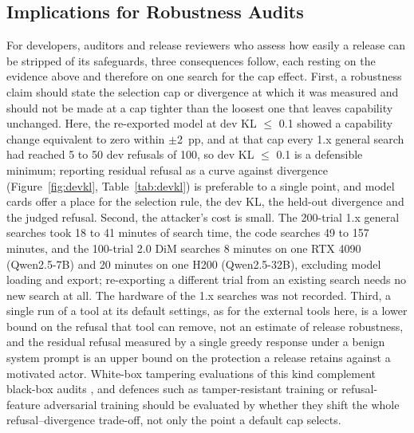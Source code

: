 \subsection{Implications for Robustness Audits}
\label{sec:audit}

For developers, auditors and release reviewers who assess how easily a release can be stripped of its safeguards,
three consequences follow, each resting on the evidence above and therefore on one search for the cap effect. First,
a robustness claim should state the selection cap or divergence at which it was measured and should not be made at a
cap tighter than the loosest one that leaves capability unchanged. Here, the re-exported model at dev KL $\le$ 0.1
showed a capability change equivalent to zero within $\pm$2~pp, and at that cap every 1.x general search had reached 5
to 50 dev refusals of 100, so dev KL $\le$ 0.1 is a defensible minimum; reporting residual refusal as a curve against
divergence (Figure~\ref{fig:devkl}, Table~\ref{tab:devkl}) is preferable to a single point, and model cards
\cite{mitchell2019modelcards} offer a place for the selection rule, the dev KL, the held-out divergence and the judged
refusal. Second, the attacker's cost is small. The 200-trial 1.x general searches took 18 to 41 minutes of search time,
the code searches 49 to 157 minutes, and the 100-trial 2.0 DiM searches 8 minutes on one RTX 4090
(Qwen2.5-7B) and 20 minutes on one H200 (Qwen2.5-32B), excluding model loading and export; re-exporting a different
trial from an existing search needs no new search at all. The hardware of the 1.x searches was not recorded. Third, a
single run of a tool at its default settings, as for the external tools here, is a lower bound on the refusal that
tool can remove, not an estimate of release robustness, and the residual refusal measured by a single greedy response
under a benign system prompt is an upper bound on the protection a release retains against a motivated actor. White-box
tampering evaluations of this kind complement black-box audits \cite{casper2024blackbox,che2025tampering}, and defences
such as tamper-resistant training \cite{tamirisa2025tamper} or refusal-feature adversarial training \cite{yu2025refat}
should be evaluated by whether they shift the whole refusal--divergence trade-off, not only the point a default cap
selects.



